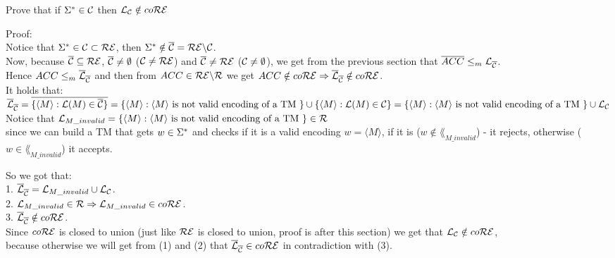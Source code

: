 Prove that if $\Sigma^* \in \mathcal{C}$ then $\mathcal{L}_{\mathcal{C}} \notin co\mathcal{R}\mathcal{E}$

Proof: \\
Notice that $\Sigma^* \in \mathcal{C} \subset \mathcal{R}\mathcal{E}$, then $\Sigma^* \notin \overline{\mathcal{C}} = \mathcal{R}\mathcal{E} \backslash \mathcal{C}$. \\
Now, because $\overline{\mathcal{C}} \subseteq \mathcal{R}\mathcal{E}$, $\overline{\mathcal{C}} \neq \emptyset$ ($\mathcal{C} \neq \mathcal{R}\mathcal{E}$) and $\overline{\mathcal{C}} \neq \mathcal{R}\mathcal{E}$ ($\mathcal{C} \neq \emptyset$),
we get from the previous section that $\overline{ACC} \leq_m \mathcal{L}_{\overline{\mathcal{C}}}$. \\
Hence $ACC \leq_m \overline{\mathcal{L}}_{\overline{\mathcal{C}}}$ and then from $ACC \in \mathcal{R}\mathcal{E} \backslash \mathcal{R}$ we get $ACC \notin co\mathcal{R}\mathcal{E} \Rightarrow \overline{\mathcal{L}}_{ \overline{\mathcal{C}}} \notin co\mathcal{R}\mathcal{E}$. \\
It holds that: \\
$\overline{\mathcal{L}}_{\overline{\mathcal{C}}} = \overline{\{\langle M \rangle : \mathcal{L}(M) \in \overline{\mathcal{C}}\}} \\
    = \{\langle M \rangle : \langle M \rangle \text{ is not valid encoding of a TM }\} \cup \{\langle M \rangle : \mathcal{L}(M) \in \mathcal{C}\}  \\
    = \{\langle M \rangle : \langle M \rangle \text{ is not valid encoding of a TM }\} \cup \mathcal{L}_{\mathcal{C}}$ \\

Notice that $\mathcal{L}_{M\_invalid} = \{\langle M \rangle : \langle M \rangle \text{ is not valid encoding of a TM }\} \in \mathcal{R}$ \\
since we can build a TM that gets $w \in \Sigma^*$ and checks if it is a valid encoding $w = \langle M \rangle$, if it is ($w \notin \lang_{M\_invalid}$) - it rejects,
otherwise ($w \in \lang_{M\_invalid}$) it accepts.

So we got that: \\
1. $\overline{\mathcal{L}}_{\overline{\mathcal{C}}} = \mathcal{L}_{M\_invalid} \cup \mathcal{L}_{\mathcal{C}}$. \\
2. $\mathcal{L}_{M\_invalid} \in \mathcal{R} \Rightarrow \mathcal{L}_{M\_invalid} \in co\mathcal{R}\mathcal{E}$. \\
3. $\overline{\mathcal{L}}_{\overline{\mathcal{C}}} \notin co\mathcal{R}\mathcal{E}$. \\

Since $co\mathcal{R}\mathcal{E}$ is closed to union (just like $\mathcal{R}\mathcal{E}$ is closed to union, proof is after this section) we get that $\mathcal{L}_{\mathcal{C}} \notin co\mathcal{R}\mathcal{E}$, \\
because otherwise we will get from (1) and (2) that $\overline{\mathcal{L}}_{\overline{\mathcal{C}}} \in co\mathcal{R}\mathcal{E}$ in contradiction with (3). \\

